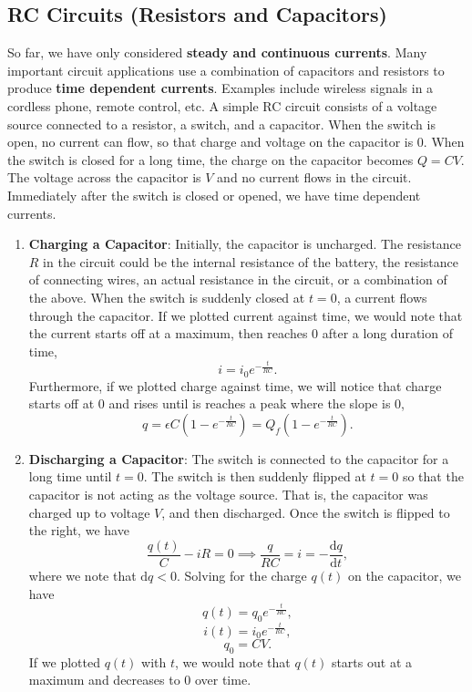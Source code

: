 \documentclass[11pt]{article}
\theoremstyle{plain} %
\theoremstyle{definition}
\theoremstyle{example}
\theoremstyle{remark}
\begin{document}
\subsection{RC Circuits (Resistors and Capacitors)}
So far, we have only considered \textbf{steady and continuous currents}. Many important circuit applications use a combination of capacitors and resistors to produce \textbf{time dependent currents}. Examples include wireless signals in a cordless phone, remote control, etc. A simple RC circuit consists of a voltage source connected to a resistor, a switch, and a capacitor. When the switch is open, no current can flow, so that charge and voltage on the capacitor is 0. When the switch is closed for a long time, the charge on the capacitor becomes $Q = CV$. The voltage across the capacitor is $V$ and no current flows in the circuit. Immediately after the switch is closed or opened, we have time dependent currents. 
\begin{enumerate}
	\item \textbf{Charging a Capacitor}: Initially, the capacitor is uncharged. The resistance $R$ in the circuit could be the internal resistance of the battery, the resistance of connecting wires, an actual resistance in the circuit, or a combination of the above. When the switch is suddenly closed at $t=0$, a current flows through the capacitor. If we plotted current against time, we would note that the current starts off at a maximum, then reaches 0 after a long duration of time, 
	$$i = i_0e^{-\frac{t}{RC}}.$$
	Furthermore, if we plotted charge against time, we will notice that charge starts off at $0$ and rises until is reaches a peak where the slope is $0$,
	$$q = \epsilon C(1-e^{-\frac{t}{RC}}) = Q_f(1-e^{-\frac{t}{RC}}).$$
	\item \textbf{Discharging a Capacitor}: The switch is connected to the capacitor for a long time until $t=0$. The switch is then suddenly flipped at $t=0$ so that the capacitor is not acting as the voltage source. That is, the capacitor was charged up to voltage $V$, and then discharged. Once the switch is flipped to the right, we have 
	$$\frac{q(t)}{C} - iR = 0 \implies \frac{q}{RC} = i = -\frac{\mathrm d q}{\mathrm d t},$$
	where we note that $\mathrm d q < 0$. Solving for the charge $q(t)$ on the capacitor, we have 
	$$q(t) = q_0e^{-\frac{t}{RC}},$$
	$$i(t) = i_0e^{-\frac{t}{RC}},$$
	$$q_0 = CV.$$
	If we plotted $q(t)$ with $t$, we would note that $q(t)$ starts out at a maximum and decreases to 0 over time. 
	
	\end{enumerate}
\end{document}
